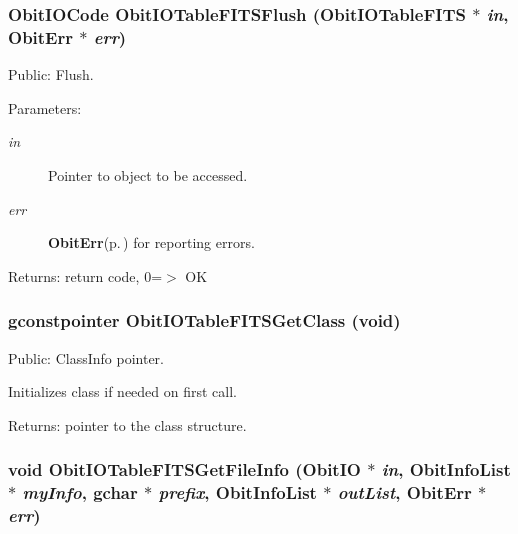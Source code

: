 \subsubsection{\setlength{\rightskip}{0pt plus 5cm}Obit\-IOCode Obit\-IOTable\-FITSFlush ({\bf Obit\-IOTable\-FITS} $\ast$ {\em in}, {\bf Obit\-Err} $\ast$ {\em err})}\label{ObitIOTableFITS_8h_a16}


Public: Flush. 

\begin{Desc}
\item[Parameters:]
\begin{description}
\item[{\em in}]Pointer to object to be accessed. \item[{\em err}]{\bf Obit\-Err}{\rm (p.\,\pageref{structObitErr})} for reporting errors. \end{description}
\end{Desc}
\begin{Desc}
\item[Returns:]return code, 0=$>$ OK \end{Desc}
\subsubsection{\setlength{\rightskip}{0pt plus 5cm}gconstpointer Obit\-IOTable\-FITSGet\-Class (void)}\label{ObitIOTableFITS_8h_a5}


Public: Class\-Info pointer. 

Initializes class if needed on first call. \begin{Desc}
\item[Returns:]pointer to the class structure. \end{Desc}
\subsubsection{\setlength{\rightskip}{0pt plus 5cm}void Obit\-IOTable\-FITSGet\-File\-Info ({\bf Obit\-IO} $\ast$ {\em in}, {\bf Obit\-Info\-List} $\ast$ {\em my\-Info}, gchar $\ast$ {\em prefix}, {\bf Obit\-Info\-List} $\ast$ {\em out\-List}, {\bf Obit\-Err} $\ast$ {\em err})}\label{ObitIOTableFITS_8h_a20}


